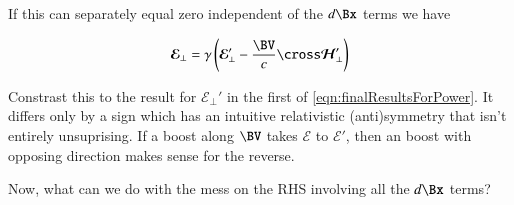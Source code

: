 \documentclass{article}
\newcommand{\EE}[0]{\boldsymbol{\mathcal{E}}}
\newcommand{\HH}[0]{\boldsymbol{\mathcal{H}}}
\begin{document}
If this can separately equal zero independent of the $d\Bx$ terms we have

\begin{align}
\EE_\perp = \gamma \left( \EE_\perp' - \frac{\BV}{c} \cross \HH_\perp' \right)
\end{align}

Constrast this to the result for $\EE_\perp'$ in the first of \ref{eqn:finalResultsForPower}.  It differs only by
a sign which has an intuitive relativistic (anti)symmetry that isn't entirely unsuprising.  If a boost along $\BV$
takes $\EE$ to $\EE'$, then an boost with opposing direction makes sense for the reverse.

Now, what can we do with the mess on the RHS involving all the $d\Bx$ terms?



\end{document}
